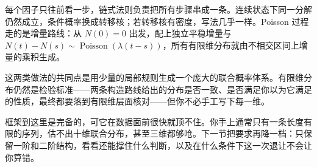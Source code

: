 每个因子只往前看一步，链式法则负责把所有步骤串成一条。连续状态下同一分解仍然成立，条件概率换成转移核；若转移核有密度，写法几乎一样。Poisson 过程走的是增量路线：从 \(N(0)=0\) 出发，配上独立平稳增量与 \(N(t)-N(s)\sim\operatorname{Poisson}(\lambda(t-s))\)，所有有限维分布就由不相交区间上增量的乘积生成。

这两类做法的共同点是用少量的局部规则生成一个庞大的联合概率体系。有限维分布仍然是检验标准——两条构造路线给出的分布是否一致、是否满足你以为它满足的性质，最终都要落到有限维层面核对——但你不必手工写下每一维。

框架到这里是完备的，可它在数据面前很快就顶不住。你手上通常只有一条长度有限的序列，估不出十维联合分布，甚至三维都够呛。下一节把要求再降一档：只保留一阶和二阶结构，看看还能撑住什么判断，以及在什么条件下这一次退让不会让你算错。
